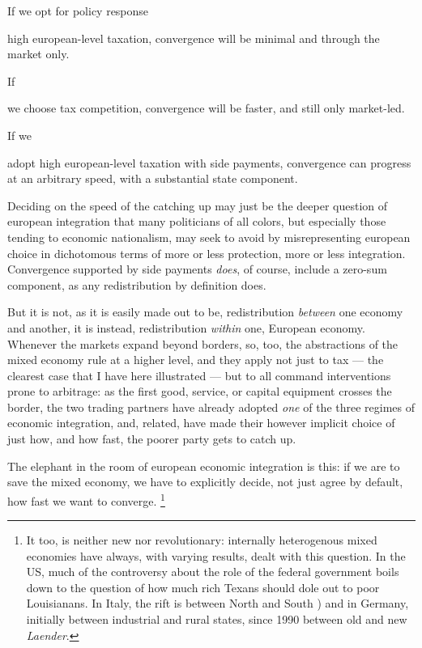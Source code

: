 If we opt for policy response
\begin{inparaenum}
	\item high european-level taxation, convergence will be minimal and through the market only.

	If
	\item we choose tax competition, convergence will be faster, and still only market-led.

	If we
	\item adopt high european-level taxation with side payments, convergence can progress at an arbitrary speed, with a substantial state component.
\end{inparaenum}

Deciding on the speed of the catching up may just be the deeper question of european integration that many politicians of all colors, but especially those tending to economic nationalism, may seek to avoid by misrepresenting european choice in dichotomous terms of more or less protection, more or less integration.
Convergence supported by side payments \emph{does}, of course, include a zero-sum component, as any redistribution by definition does.

But it is not, as it is easily made out to be, redistribution \emph{between} one economy and another, it is instead, redistribution \emph{within} one, European economy.
Whenever the markets expand beyond borders, so, too, the abstractions of the mixed economy rule at a higher level, and they apply not just to tax --- the clearest case that I have here illustrated --- but to all command interventions prone to arbitrage:
as the first good, service, or capital equipment crosses the border, the two trading partners have already adopted \emph{one} of the three regimes of economic integration, and, related, have made their however implicit choice of just how, and how fast, the poorer party gets to catch up.

The elephant in the room of european economic integration is this:
if we are to save the mixed economy, we have to explicitly decide, not just agree by default, how fast we want to converge.
\footnote{
	It too, is neither new nor revolutionary:
	internally heterogenous mixed economies have always, with varying results, dealt with this question.
	In the US, much of the controversy about the role of the federal government boils down to the question of how much rich Texans should dole out to poor Louisianans.
	In Italy, the rift is between North and South \citep[for example,][]{PutnamLeonardi-1993-aa}) and in Germany, initially between industrial and rural states, since 1990 between old and new \emph{Laender}.
}


